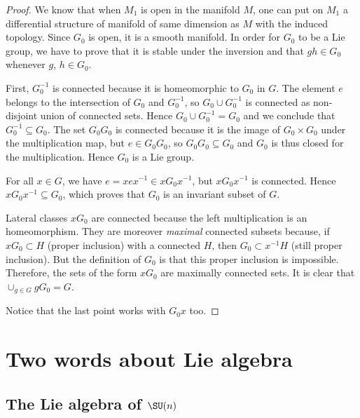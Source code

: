 \begin{proof}
We know that when $M_{1}$ is open in the manifold $M$, one can put on $M_{1}$ a differential structure of manifold of same dimension as $M$ with the induced topology. Since $G_0$ is open, it is a smooth manifold. In order for $G_0$ to be a Lie group, we have to prove that it is stable under the inversion and that $gh\in G_0$ whenever $g$, $h\in G_0$.

First, $G_0^{-1}$ is connected because  it is homeomorphic to $G_0$ in $G$. The element $e$ belongs to the intersection of $G_0$ and $G_0^{-1}$, so $G_0\cup G_0^{-1}$ is connected as non-disjoint union of connected sets. Hence $G_0\cup G_0^{-1}=G_0$ and we conclude that $G_0^{-1}\subseteq G_0$. The set $G_0G_0$ is connected because it is the image of $G_0\times G_0$ under the multiplication map, but $e\in G_0G_0$, so $G_0G_0\subseteq G_0$ and  $G_0$ is thus closed for the multiplication. Hence $G_0$ is a Lie group.

For all $x\in G$, we have $e=xex^{-1}\in xG_0x^{-1}$, but $xG_0x^{-1}$ is connected. Hence $xG_0x^{-1}\subseteq G_0$, which proves that $G_0$ is an invariant subset of $G$.

Lateral classes $xG_0$ are connected because the left multiplication is an homeomorphism. They are moreover \emph{maximal} connected subsets because, if $xG_0\subset H$ (proper inclusion) with a connected $H$, then $G_0\subset x^{-1}H$ (still proper inclusion). But the definition of $G_0$ is that this proper inclusion is impossible. Therefore, the sets of the form $xG_0$ are maximally connected sets. It is clear that $\cup_{g\in G}gG_0=G$.

Notice that the last point works with $G_0x$ too.
\end{proof}

\section{Two words about Lie algebra}

\subsection{The Lie algebra of \texorpdfstring{$\SU(n)$}{SU2}}

